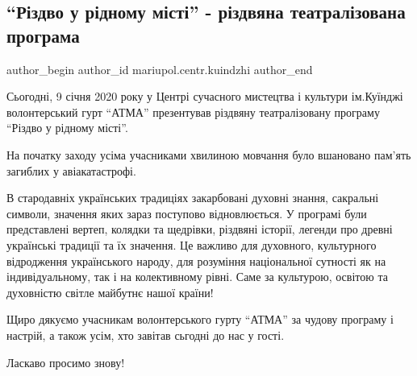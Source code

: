  
 
 
 
 

\subsection{\enquote{Різдво у рідному місті} - різдвяна театралізована програма}
\label{sec:09_01_2020.fb.mariupol.centr.kuindzhi.1.rizdvo_u_ridnomu_misti}

\ifcmt
 author_begin
   author_id mariupol.centr.kuindzhi
 author_end
\fi

Сьогодні, 9 січня 2020 року у Центрі сучасного мистецтва і культури ім.Куїнджі
волонтерський гурт \enquote{АТМА} презентував різдвяну театралізовану програму \enquote{Різдво
у рідному місті}.

На початку заходу усіма учасниками хвилиною мовчання було вшановано пам'ять
загиблих у авіакатастрофі.

В стародавніх українських традиціях закарбовані духовні знання, сакральні
символи, значення яких зараз поступово відновлюється. У  програмі були
представлені вертеп, колядки та щедрівки, різдвяні історії, легенди про древні
українські традиції та їх значення. Це важливо для духовного, культурного
відродження українського народу, для розуміння національної сутності як на
індивідуальному, так і на колективному рівні. Саме за культурою, освітою та
духовністю світле майбутнє нашої країни!

Щиро дякуємо учасникам волонтерського гурту \enquote{АТМА} за чудову програму і
настрій, а також усім, хто завітав сьгодні до нас у гості.

Ласкаво просимо знову!
